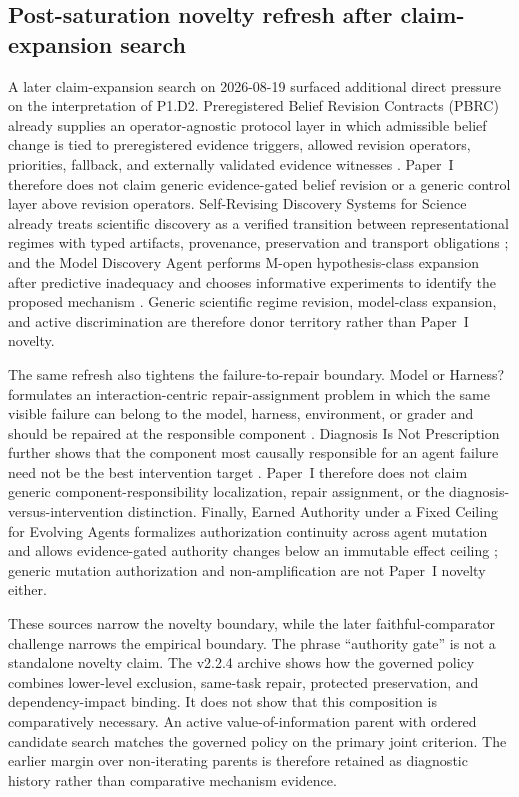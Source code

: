\subsection{Post-saturation novelty refresh after claim-expansion search}

A later claim-expansion search on 2026-08-19 surfaced additional direct pressure on the interpretation of P1.D2. Preregistered Belief Revision Contracts (PBRC) already supplies an operator-agnostic protocol layer in which admissible belief change is tied to preregistered evidence triggers, allowed revision operators, priorities, fallback, and externally validated evidence witnesses \cite{pbrc2026}. Paper~I therefore does not claim generic evidence-gated belief revision or a generic control layer above revision operators. Self-Revising Discovery Systems for Science already treats scientific discovery as a verified transition between representational regimes with typed artifacts, provenance, preservation and transport obligations \cite{selfrevisingdiscovery2026}; and the Model Discovery Agent performs M-open hypothesis-class expansion after predictive inadequacy and chooses informative experiments to identify the proposed mechanism \cite{modeldiscoveryagent2026}. Generic scientific regime revision, model-class expansion, and active discrimination are therefore donor territory rather than Paper~I novelty.

The same refresh also tightens the failure-to-repair boundary. Model or Harness? formulates an interaction-centric repair-assignment problem in which the same visible failure can belong to the model, harness, environment, or grader and should be repaired at the responsible component \cite{modelorharness2026}. Diagnosis Is Not Prescription further shows that the component most causally responsible for an agent failure need not be the best intervention target \cite{diagnosisnotprescription2026}. Paper~I therefore does not claim generic component-responsibility localization, repair assignment, or the diagnosis-versus-intervention distinction. Finally, Earned Authority under a Fixed Ceiling for Evolving Agents formalizes authorization continuity across agent mutation and allows evidence-gated authority changes below an immutable effect ceiling \cite{earnedauthority2026}; generic mutation authorization and non-amplification are not Paper~I novelty either.

These sources narrow the novelty boundary, while the later faithful-comparator challenge narrows the empirical boundary. The phrase ``authority gate'' is not a standalone novelty claim. The v2.2.4 archive shows how the governed policy combines lower-level exclusion, same-task repair, protected preservation, and dependency-impact binding. It does not show that this composition is comparatively necessary. An active value-of-information parent with ordered candidate search matches the governed policy on the primary joint criterion. The earlier margin over non-iterating parents is therefore retained as diagnostic history rather than comparative mechanism evidence.

